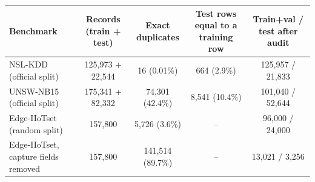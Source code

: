 \begin{tabular}{lcccc}
\toprule
Benchmark & Records (train + test) & Exact duplicates & Test rows equal to a training row & Train+val / test after audit \\
\midrule
NSL-KDD (official split) & 125,973 + 22,544 & 16 (0.01\%) & 664 (2.9\%) & 125,957 / 21,833 \\
UNSW-NB15 (official split) & 175,341 + 82,332 & 74,301 (42.4\%) & 8,541 (10.4\%) & 101,040 / 52,644 \\
Edge-IIoTset (random split) & 157,800 & 5,726 (3.6\%) & -- & 96,000 / 24,000 \\
Edge-IIoTset, capture fields removed & 157,800 & 141,514 (89.7\%) & -- & 13,021 / 3,256 \\
\bottomrule
\end{tabular}
